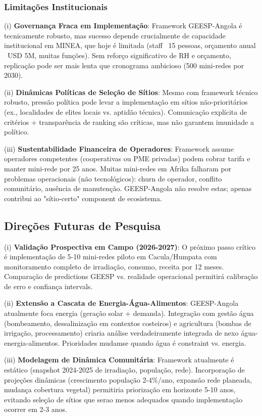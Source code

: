 \documentclass[12pt, a4paper]{article}
\begin{document}
\subsubsection{Limitações Institucionais}

(i) \textbf{Governança Fraca em Implementação}: Framework GEESP-Angola é tecnicamente robusto, mas sucesso depende crucialmente de capacidade institucional em MINEA, que hoje é limitada (staff ~15 pessoas, orçamento anual ~USD 5M, muitas funções). Sem reforço significativo de RH e orçamento, replicação pode ser mais lenta que cronograma ambicioso (500 mini-redes por 2030).

(ii) \textbf{Dinâmicas Políticas de Seleção de Sítios}: Mesmo com framework técnico robusto, pressão política pode levar a implementação em sítios não-prioritários (ex., localidades de elites locais vs. aptidão técnica). Comunicação explícita de critérios + transparência de ranking são críticas, mas não garantem imunidade a político.

(iii) \textbf{Sustentabilidade Financeira de Operadores}: Framework assume operadores competentes (cooperativas ou PME privadas) podem cobrar tarifa e manter mini-rede por 25 anos. Muitas mini-redes em Afrika falharam por problemas operacionais (não tecnológicos): churn de operador, conflito comunitário, ausência de manutenção. GEESP-Angola não resolve estas; apenas contribui ao "sítio-certo" component de ecosistema.

\subsection{Direções Futuras de Pesquisa}

(i) \textbf{Validação Prospectiva em Campo (2026-2027)}: O próximo passo crítico é implementação de 5-10 mini-redes piloto em Cacula/Humpata com monitoramento completo de irradiação, consumo, receita por 12 meses. Comparação de predictions GEESP vs. realidade operacional permitirá calibração de erro e confiança intervals.

(ii) \textbf{Extensão a Cascata de Energia-Água-Alimentos}: GEESP-Angola atualmente foca energia (geração solar + demanda). Integração com gestão água (bombeamento, dessalinização em contextos costeiros) e agricultura (bombas de irrigação, processamento) criaria análise verdadeiramente integrada de nexo água-energia-alimentos. Prioridades mudamse quando água é constraint vs. energia.

(iii) \textbf{Modelagem de Dinâmica Comunitária}: Framework atualmente é estático (snapshot 2024-2025 de irradiação, população, rede). Incorporação de projeções dinâmicas (crescimento população 2-4\%/ano, expansão rede planeada, mudança cobertura vegetal) permitiria priorização em horizonte 5-10 anos, evitando seleção de sítios que serao menos adequados quando implementação ocorrer em 2-3 anos.
\end{document}
